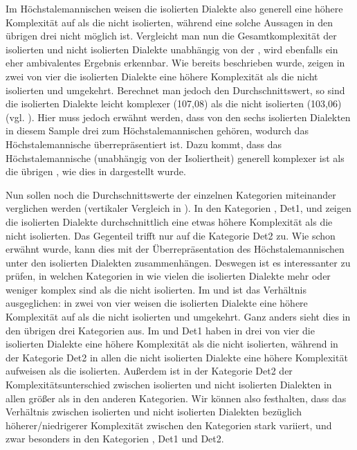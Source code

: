 Im Höchstalemannischen weisen die isolierten Dialekte also generell eine höhere Komplexität auf als die nicht isolierten, während eine solche Aussagen in den übrigen drei  nicht möglich ist. Vergleicht man nun die Gesamtkomplexität der isolierten und nicht isolierten Dialekte unabhängig von der , wird ebenfalls ein eher ambivalentes Ergebnis erkennbar. Wie bereits beschrieben wurde, zeigen in zwei von vier  die isolierten Dialekte eine höhere Komplexität als die nicht isolierten und umgekehrt. Berechnet man jedoch den Durchschnittswert, so sind die isolierten Dialekte leicht komplexer (107,08) als die nicht isolierten (103,06) (vgl. ). Hier muss jedoch erwähnt werden, dass von den sechs isolierten Dialekten in diesem Sample drei zum Höchstalemannischen gehören, wodurch das Höchstalemannische überrepräsentiert ist. Dazu kommt, dass das Höchstalemannische (unabhängig von der Isoliertheit) generell komplexer ist als die übrigen , wie dies in  dargestellt wurde.

Nun sollen noch die Durchschnittswerte der einzelnen Kategorien miteinander verglichen werden (vertikaler Vergleich in ). In den Kategorien , Det1,  und  zeigen die isolierten Dialekte durchschnittlich eine etwas höhere Komplexität als die nicht isolierten. Das Gegenteil trifft nur auf die Kategorie Det2 zu. Wie schon erwähnt wurde, kann dies mit der Überrepräsentation des Höchstalemannischen unter den isolierten Dialekten zusammenhängen. Deswegen ist es interessanter zu prüfen, in welchen Kategorien in wie vielen  die isolierten Dialekte mehr oder weniger komplex sind als die nicht isolierten. Im  und  ist das Verhältnis ausgeglichen: in zwei von vier  weisen die isolierten Dialekte eine höhere Komplexität auf als die nicht isolierten und umgekehrt. Ganz anders sieht dies in den übrigen drei Kategorien aus. Im  und Det1 haben in drei von vier  die isolierten Dialekte eine höhere Komplexität als die nicht isolierten, während in der Kategorie Det2 in allen  die nicht isolierten Dialekte eine höhere Komplexität aufweisen als die isolierten. Außerdem ist in der Kategorie Det2 der Komplexitätsunterschied zwischen isolierten und nicht isolierten Dialekten in allen  größer als in den anderen Kategorien. Wir können also festhalten, dass das Verhältnis zwischen isolierten und nicht isolierten Dialekten bezüglich höherer/niedrigerer Komplexität zwischen den Kategorien stark variiert, und zwar besonders in den Kategorien , Det1 und Det2.


